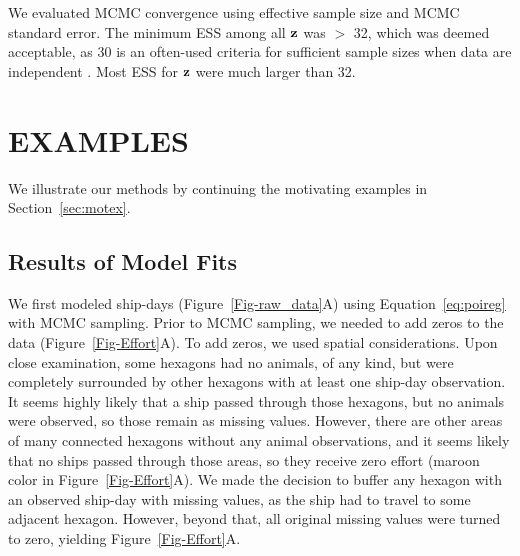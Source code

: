 \documentclass[11pt, titlepage]{article}
\begin{document}
\begin{spacing}{1.9}
\begin{flushleft}
We evaluated MCMC convergence using effective sample size \citep[ESS,][]{flegal_markov_2008, gong_practical_2016} and MCMC standard error.  The minimum ESS among all $\mathbf{z}$ was $>$ 32, which was deemed acceptable, as 30 is an often-used criteria for sufficient sample sizes when data are independent \citep[likely originating in][]{student_probable_1908}.  Most ESS for $\mathbf{z}$ were much larger than 32.


\section{EXAMPLES}

We illustrate our methods by continuing the motivating examples in Section~\ref{sec:motex}.


\subsection{Results of Model Fits}

We first modeled ship-days (Figure~\ref{Fig-raw_data}A) using Equation~\eqref{eq:poireg} with MCMC sampling.  Prior to MCMC sampling, we needed to add zeros to the data (Figure~\ref{Fig-Effort}A).  To add zeros, we used spatial considerations.  Upon close examination, some hexagons had no animals, of any kind, but were completely surrounded by other hexagons with at least one ship-day observation.  It seems highly likely that a ship passed through those hexagons, but no animals were observed, so those remain as missing values.  However, there are other areas of many connected hexagons without any animal observations, and it seems likely that no ships passed through those areas, so they receive zero effort (maroon color in Figure~\ref{Fig-Effort}A). We made the decision to buffer any hexagon with an observed ship-day with missing values, as the ship had to travel to some adjacent hexagon.  However, beyond that, all original missing values were turned to zero, yielding Figure~\ref{Fig-Effort}A.


\end{flushleft}
\end{spacing}
\end{document}
